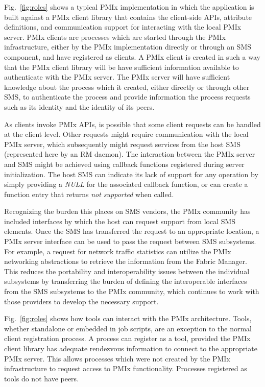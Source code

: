 Fig.~\ref{fig:roles} shows a typical \ac{PMIx} implementation in which the application is 
built against a \ac{PMIx} client library that contains the client-side \acp{API},
attribute definitions, and communication support for interacting with the local \ac{PMIx} server. 
\ac{PMIx} clients are processes which are started through the \ac{PMIx} infrastructure, 
either by the PMIx implementation directly or through an \ac{SMS} component, and have registered 
as clients.  A \ac{PMIx} client 
is created in such a way that the \ac{PMIx} client library
will be have sufficient information available to
authenticate with the \ac{PMIx} server.  
The \ac{PMIx} server will have sufficient knowledge about the  
process which it created, either directly or through other \ac{SMS}, to authenticate the 
process and provide information the process requests such as its identity and the 
identity of its peers.  

As clients invoke \ac{PMIx} \acp{API}, is possible that some client requests can 
be handled at the client level.  Other requests might require communication with the 
local \ac{PMIx} server, which subsequently might request services from the host \ac{SMS} 
(represented here by an \ac{RM} daemon).  The interaction between the \ac{PMIx} server and \ac{SMS} might be 
achieved using callback functions registered during server initialization.  
The host \ac{SMS} can indicate its lack of support for any operation by simply providing a \textit{NULL} for the associated callback function, or can create a function entry that returns \textit{not supported} when called.

Recognizing the burden this places on SMS vendors, the PMIx community has included interfaces by
which the host can request support from local SMS elements. Once the SMS has transferred the request to
an appropriate location, a \ac{PMIx} server interface can be used to pass the request 
between \ac{SMS} subsystems.
For example, a request for network traffic statistics can utilize the
PMIx networking abstractions to retrieve the information from the Fabric Manager. 
This reduces the portability and
interoperability issues between the individual subsystems by transferring the burden of defining the
interoperable interfaces from the \ac{SMS} subsystems to the \ac{PMIx} community, which continues
to work with those providers to develop the necessary support.

Fig.~\ref{fig:roles} shows how tools can interact with the \ac{PMIx} architecture.
Tools, whether standalone or embedded in job scripts, are an exception to 
the normal client registration process.   A process can register as a tool, provided 
the \ac{PMIx} client library has adequate rendezvous information to connect to the appropriate
\ac{PMIx} server.  This allows processes
which were not created by the PMIx infrastructure to request access to PMIx functionality. 
Processes registered as tools do not have peers.  

